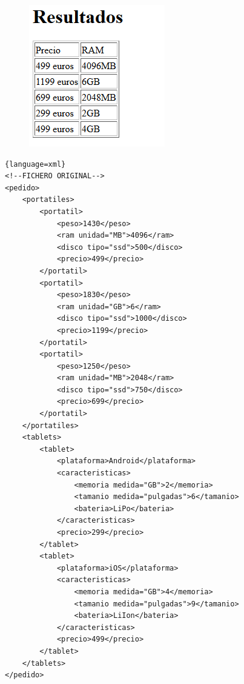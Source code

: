 \documentclass{examen}
\begin{document}



\begin{figure}[h]
\includegraphics[scale=0.8]{examen-img/ejtabla.png}
\end{figure}



\break

\begin{lstlisting}{language=xml}
<!--FICHERO ORIGINAL-->
<pedido>
	<portatiles>
		<portatil>
			<peso>1430</peso>
			<ram unidad="MB">4096</ram>
			<disco tipo="ssd">500</disco>
			<precio>499</precio>
		</portatil>
		<portatil>
			<peso>1830</peso>
			<ram unidad="GB">6</ram>
			<disco tipo="ssd">1000</disco>
			<precio>1199</precio>
		</portatil>
		<portatil>
			<peso>1250</peso>
			<ram unidad="MB">2048</ram>
			<disco tipo="ssd">750</disco>
			<precio>699</precio>
		</portatil>
	</portatiles>
	<tablets>
		<tablet>
			<plataforma>Android</plataforma>
			<caracteristicas>
				<memoria medida="GB">2</memoria>
				<tamanio medida="pulgadas">6</tamanio>
				<bateria>LiPo</bateria>
			</caracteristicas>
			<precio>299</precio>
		</tablet>
		<tablet>
			<plataforma>iOS</plataforma>
			<caracteristicas>
				<memoria medida="GB">4</memoria>
				<tamanio medida="pulgadas">9</tamanio>
				<bateria>LiIon</bateria>
			</caracteristicas>
			<precio>499</precio>
		</tablet>
	</tablets>
</pedido>

\end{lstlisting}
\end{document}
